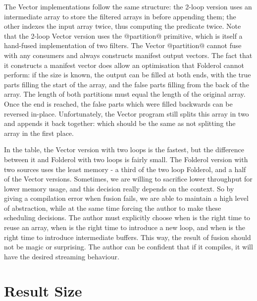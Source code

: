 The Vector implementations follow the same structure: the 2-loop version uses an intermediate array to store the filtered arrays in before appending them; the other indexes the input array twice, thus computing the predicate twice.
Note that the 2-loop Vector version uses the @partition@ primitive, which is itself a hand-fused implementation of two filters.
The Vector @partition@ cannot fuse with any consumers and always constructs manifest output vectors.
The fact that it constructs a manifest vector does allow an optimisation that Folderol cannot perform: if the size is known, the output can be filled at both ends, with the true parts filling the start of the array, and the false parts filling from the back of the array.
The length of both partitions must equal the length of the original array.
Once the end is reached, the false parts which were filled backwards can be reversed in-place.
Unfortunately, the Vector program still splits this array in two and appends it back together: which should be the same as not splitting the array in the first place.

In the table, the Vector version with two loops is the fastest, but the difference between it and Folderol with two loops is fairly small.
The Folderol version with two sources uses the least memory - a third of the two loop Folderol, and a half of the Vector versions.
Sometimes, we are willing to sacrifice lower throughput for lower memory usage, and this decision really depends on the context.
So by giving a compilation error when fusion fails, we are able to maintain a high level of abstraction, while at the same time forcing the author to make these scheduling decisions.
The author must explicitly choose when is the right time to reuse an array, when is the right time to introduce a new loop, and when is the right time to introduce intermediate buffers.
This way, the result of fusion should not be magic or surprising.
The author can be confident that if it compiles, it will have the desired streaming behaviour.

\section{Result Size}

